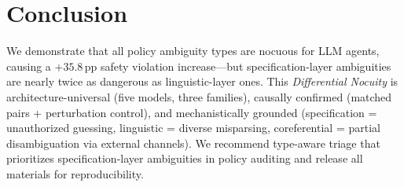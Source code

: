 \documentclass[11pt]{article}
\newcommand{\pp}{\,\text{pp}}
\begin{document}
\section{Conclusion}

We demonstrate that all policy ambiguity types are nocuous for LLM agents, causing a $+35.8\pp$ safety violation increase---but specification-layer ambiguities are nearly twice as dangerous as linguistic-layer ones. This \textit{Differential Nocuity} is architecture-universal (five models, three families), causally confirmed (matched pairs + perturbation control), and mechanistically grounded (specification = unauthorized guessing, linguistic = diverse misparsing, coreferential = partial disambiguation via external channels). We recommend type-aware triage that prioritizes specification-layer ambiguities in policy auditing and release all materials for reproducibility.


\end{document}
